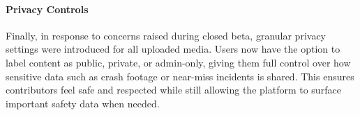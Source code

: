 \paragraph{Privacy Controls}

Finally, in response to concerns raised during closed beta, granular privacy settings were introduced for all uploaded media. Users now have the option to label content as public, private, or admin-only, giving them full control over how sensitive data such as crash footage or near-miss incidents is shared. This ensures contributors feel safe and respected while still allowing the platform to surface important safety data when needed.





